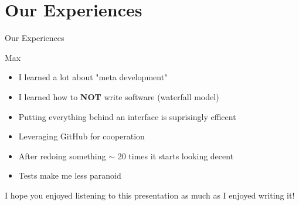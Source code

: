 \documentclass{beamer}
\begin{document}
\section{Our Experiences}

\begin{frame}
  \begin{center}
    \Huge{Our Experiences}
  \end{center}
\end{frame}

\begin{frame}{Max}
  \begin{itemize}
    \item I learned a lot about "meta development"
    \item I learned how to \textbf{NOT} write software (waterfall model)
    \item Putting everything behind an interface is suprisingly efficent
    \item Leveraging GitHub for cooperation
    \item After redoing something $\sim$ 20 times it starts looking decent
    \item Tests make me less paranoid
  \end{itemize}
\end{frame}

\begin{frame}
  \begin{center}
    \Huge{I hope you enjoyed listening to this presentation as much as I enjoyed writing it!}
  \end{center}
\end{frame}
\end{document}
